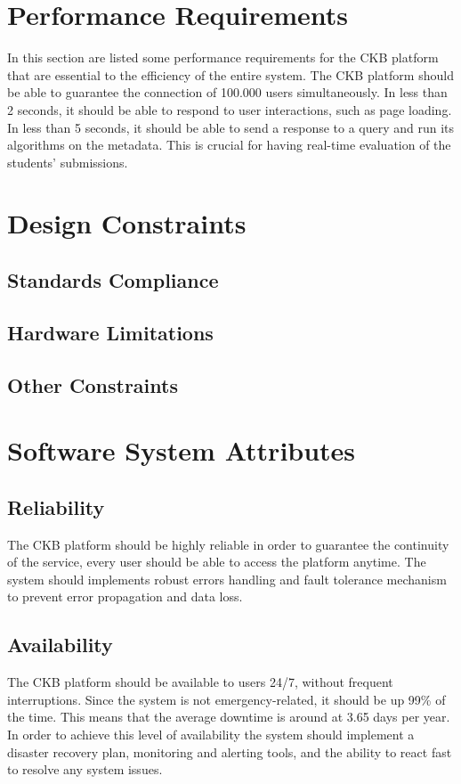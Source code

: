 \section{Performance Requirements}
In this section are listed some performance requirements for the CKB platform that are essential to the efficiency of the entire system.
The CKB platform should be able to guarantee the connection of 100.000 users simultaneously. \newline 
In less than 2 seconds, it should be able to respond to user interactions, such as page loading. \newline
In less than 5 seconds, it should be able to send a response to a query and run its algorithms on the metadata. This is crucial for having real-time evaluation of the students' submissions.

\section{Design Constraints}
\subsection{Standards Compliance}
\subsection{Hardware Limitations}
\subsection{Other Constraints}

\section{Software System Attributes}
\subsection{Reliability}
The CKB platform should be highly reliable in order to guarantee the continuity of the service, every user should be able to access the platform anytime. The system should implements robust errors handling and fault tolerance mechanism to prevent error propagation and data loss. \subsection{Availability}
The CKB platform should be available to users 24/7, without frequent interruptions. 
Since the system is not emergency-related, it should be up 99\% of the time.
This means that the average downtime is around at 3.65 days per year. \newline
In order to achieve this level of availability the system should implement a disaster recovery plan, monitoring and alerting tools, and the ability to react fast to resolve any system issues.
